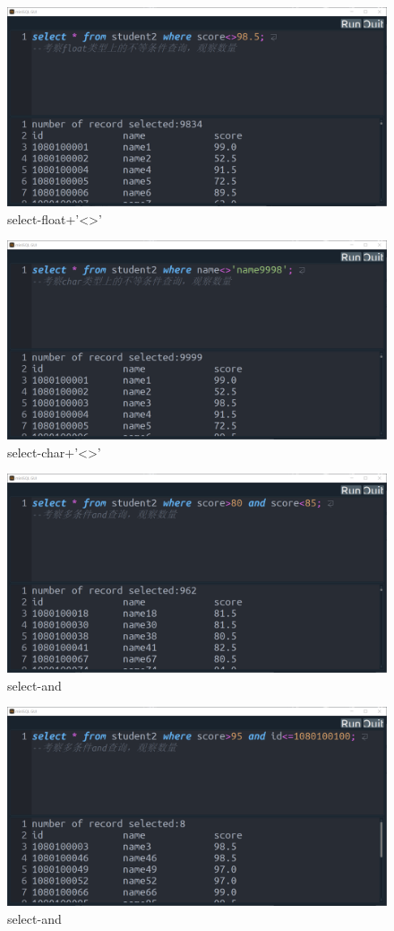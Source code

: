 \documentclass[UTF8]{ctexrep} %
\begin{document}
\begin{figure}[H]
    \centering
    \includegraphics[width=0.8\linewidth]{figure/5.5.png}
    \caption{select-float+'<>'}
    \label{fig:runtime5.5}
\end{figure}
\begin{figure}[H]
    \centering
    \includegraphics[width=0.8\linewidth]{figure/5.6.png}
    \caption{select-char+'<>'}
    \label{fig:runtime5.6}
\end{figure}
\begin{figure}[H]
    \centering
    \includegraphics[width=0.8\linewidth]{figure/5.7.png}
    \caption{select-and}
    \label{fig:runtime5.7}
\end{figure}
\begin{figure}[H]
    \centering
    \includegraphics[width=0.8\linewidth]{figure/5.8.png}
    \caption{select-and}
    \label{fig:runtime5.8}
\end{figure}
\end{document}

